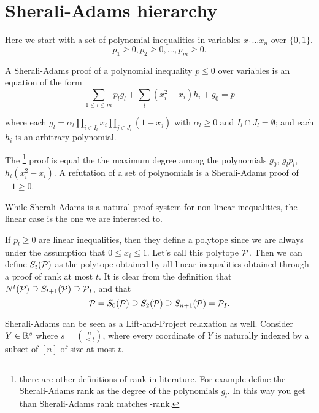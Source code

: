 \documentclass[a4paper,twoside,justified]{tufte-handout}
\begin{document}
\section{Sherali-Adams hierarchy}

Here we start with a set of polynomial inequalities in variables $
x_{1}\ldots x_{n} $ over $ \{0,1\} $.
\begin{equation}
  p_{1}\geq 0 , p_{2}\geq 0, \ldots , p_{m} \geq 0. 
\end{equation}

A Sherali-Adams proof of a polynomial inequality $p\leq 0$ over variables is an
equation of the form
\begin{equation}
 \label{eq:sa_inference}
 \sum_{1\leq l\leq m} p_{l} g_{l} + \sum_{i} (x^{2}_{i} -x_{i}) h_{i}
 + g_{0}= p
\end{equation}

where each $ g_{l} = \alpha_{l} \prod_{i\in I_{l}} x_{i} \prod_{j \in
  J_{l}}(1-x_{j}) $ with $ \alpha_{l}\geq 0 $ and $ I_{l} \cap
J_{l}=\emptyset $; and each $ h_{i} $ is an arbitrary polynomial.

The %
\footnote{there are other definitions of rank in literature. For
  example\cite{laurent01} define the Sherali-Adams rank as the degree
  of the polynomials $ g_{l} $. In this way you get than Sherali-Adams
rank matches \Lovasz-\Schrijver rank.} 
%
proof is equal the the
maximum degree among the polynomials $ g_{0} $, $ g_{l}p_{l} $, $
h_{i}(x^{2}_{i}- x_{i}) $. A refutation of a set of polynomials is a
Sherali-Adams proof of $ -1 \geq 0 $.

While Sherali-Adams is a natural proof system for non-linear
inequalities, the linear case is the one we are interested to.

If $ p_{l}\geq 0 $ are linear inequalities, then they define a
polytope since we are always under the assumption that $0\leq
x_{i}\leq 1 $. Let's call this polytope $ \mathcal{P} $. Then we can
define $ S_{t}(\mathcal{P}) $ as the polytope obtained by all linear
inequalities obtained through a proof of rank at most $ t $. It is
clear from the definition that $ N^{t}(\mathcal{P}) \supseteq
S_{t+1}(\mathcal{P}) \supseteq \mathcal{P}_{I} $, and that 
\begin{equation}
  \mathcal{P}=S_{0}(\mathcal{P}) \supseteq S_{2}(\mathcal{P}) \supseteq
  S_{n+1}(\mathcal{P}) = \mathcal{P}_{I}.
\end{equation}


Sherali-Adams can be seen as a Lift-and-Project relaxation as
well. Consider $ Y\in \mathbb{R}^{s} $ where $ s=\binom{n}{\leq t} $,
where every coordinate of $ Y $ is naturally indexed by a subset
of $ [n] $ of size at most $ t $.
\end{document}
